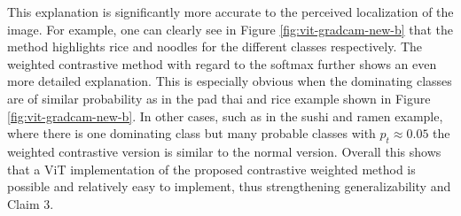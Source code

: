 This explanation is significantly more accurate to the perceived localization of the image. For example, one can clearly see in Figure \ref{fig:vit-gradcam-new-b} that the method highlights rice and noodles for the different classes respectively. The weighted contrastive method with regard to the softmax further shows an even more detailed explanation. This is especially obvious when the dominating classes are of similar probability as in the pad thai and rice example shown in Figure \ref{fig:vit-gradcam-new-b}. In other cases, such as in the sushi and ramen example, where there is one dominating class but many probable classes with $p_t\approx0.05$ the weighted contrastive version is similar to the normal version. Overall this shows that a ViT implementation of the proposed contrastive weighted method is possible and relatively easy to implement, thus strengthening generalizability and Claim 3.


% 

